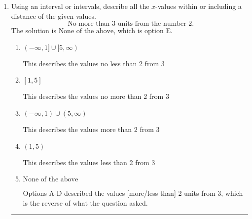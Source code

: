 \documentclass{extbook}[14pt]
\newcommand{\litem}[1]{\item #1

\rule{\textwidth}{0.4pt}}
\begin{document}
\begin{enumerate}
{\begin{enumerate}[label=\Alph*.]
$[-21.67, -2.31)$, which is the correct option.
\item \( (-\infty, a) \cup [b, \infty), \text{ where } a \in [-23.25, -18.75] \text{ and } b \in [-7.5, -1.5] \)

$(-\infty, -21.67) \cup [-2.31, \infty)$, which corresponds to displaying the and-inequality as an or-inequality AND flipping the inequality.
\item \( (a, b], \text{ where } a \in [-23.25, -18] \text{ and } b \in [-8.25, 1.5] \)

$(-21.67, -2.31]$, which corresponds to flipping the inequality.
\item \( (-\infty, a] \cup (b, \infty), \text{ where } a \in [-24, -18] \text{ and } b \in [-3.75, 0] \)

$(-\infty, -21.67] \cup (-2.31, \infty)$, which corresponds to displaying the and-inequality as an or-inequality.
\item \( \text{None of the above.} \)


\end{enumerate}

\textbf{General Comment:} To solve, you will need to break up the compound inequality into two inequalities. Be sure to keep track of the inequality! It may be best to draw a number line and graph your solution.
}
\litem{
Using an interval or intervals, describe all the $x$-values within or including a distance of the given values.
\[ \text{ No more than } 3 \text{ units from the number } 2. \]The solution is \( \text{None of the above} \), which is option E.\begin{enumerate}[label=\Alph*.]
\item \( (-\infty, 1] \cup [5, \infty) \)

This describes the values no less than 2 from 3
\item \( [1, 5] \)

This describes the values no more than 2 from 3
\item \( (-\infty, 1) \cup (5, \infty) \)

This describes the values more than 2 from 3
\item \( (1, 5) \)

This describes the values less than 2 from 3
\item \( \text{None of the above} \)

Options A-D described the values [more/less than] 2 units from 3, which is the reverse of what the question asked.
\end{enumerate}

}
\end{enumerate}
\end{document}
